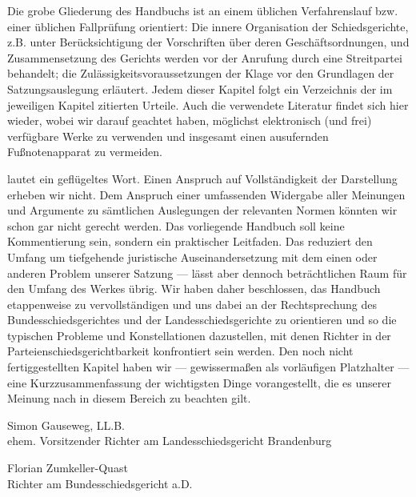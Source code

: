 Die grobe Gliederung des Handbuchs ist an einem üblichen Verfahrenslauf bzw. einer üblichen Fallprüfung orientiert:
Die innere Organisation der Schiedsgerichte, z.B. unter Berücksichtigung der Vorschriften über deren Geschäftsordnungen, und Zusammensetzung des Gerichts werden vor der Anrufung durch eine Streitpartei behandelt; die Zulässigkeitsvoraussetzungen der Klage vor den Grundlagen der Satzungsauslegung erläutert.
Jedem dieser Kapitel folgt ein Verzeichnis der im jeweiligen Kapitel zitierten Urteile.
Auch die verwendete Literatur findet sich hier wieder, wobei wir darauf geachtet haben, möglichst elektronisch (und frei) verfügbare Werke zu verwenden und insgesamt einen ausufernden Fußnotenapparat zu vermeiden.

 lautet ein geflügeltes Wort.
Einen Anspruch auf Vollständigkeit der Darstellung erheben wir nicht.
Dem Anspruch einer umfassenden Widergabe aller Meinungen und Argumente zu sämtlichen Auslegungen der relevanten Normen könnten wir schon gar nicht gerecht werden.
Das vorliegende Handbuch soll keine Kommentierung sein, sondern ein praktischer Leitfaden.
Das reduziert den Umfang um tiefgehende juristische Auseinandersetzung mit dem einen oder anderen Problem unserer Satzung --- lässt aber dennoch beträchtlichen Raum für den Umfang des Werkes übrig.
Wir haben daher beschlossen, das Handbuch etappenweise zu vervollständigen und uns dabei an der Rechtsprechung des Bundesschiedsgerichtes und der Landesschiedsgerichte zu orientieren und so die typischen Probleme und Konstellationen dazustellen, mit denen Richter in der Parteienschiedsgerichtbarkeit konfrontiert sein werden.
Den noch nicht fertiggestellten Kapitel haben wir --- gewissermaßen als vorläufigen Platzhalter --- eine Kurzzusammenfassung der wichtigsten Dinge vorangestellt, die es unserer Meinung nach in diesem Bereich zu beachten gilt.


\vspace{20mm}

Simon Gauseweg, LL.B.\\
ehem. Vorsitzender Richter am Landesschiedsgericht Brandenburg

\vspace{5mm}

Florian Zumkeller-Quast\\
Richter am Bundesschiedsgericht a.D.


 
